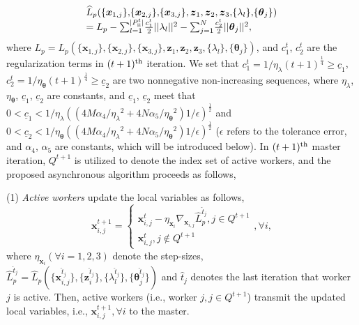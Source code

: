 \documentclass[letterpaper]{article} %
\begin{document}
\begin{equation}
\begin{array}{l}
\widehat{L}_p(\{{\boldsymbol{x}_{1,j}}\} ,\!\{{\boldsymbol{x}_{2,j}}\} ,\!\{{\boldsymbol{x}_{3,j}}\} ,{\boldsymbol{z}_1},{\boldsymbol{z}_2},{\boldsymbol{z}_3},\! \{\lambda_l\}, \!\{\boldsymbol{\theta}_j\} ) \\ = {L_p} - \sum\nolimits_{l = 1}^{|P_{{\rm{\uppercase\expandafter{\romannumeral2}}}}^{t}|} \!\frac{c_1^t}{2}||\lambda_l||^2 - \sum\nolimits_{j = 1}^{N}\! \frac{c_2^t}{2}||\boldsymbol{\theta}_j||^2,
\end{array}
\end{equation}
where $L_p\!=\!L_p(\{{\boldsymbol{x}_{1,j}}\} ,\!\{{\boldsymbol{x}_{2,j}}\} ,\!\{{\boldsymbol{x}_{3,j}}\} ,\!{\boldsymbol{z}_1},\!{\boldsymbol{z}_2},\!{\boldsymbol{z}_3},\! \{\lambda_l\}, \!\{\boldsymbol{\theta}_j\} )$, and $c_1^t$, $c_2^t$ are the regularization terms in $(t+1)^{\rm{th}}$ iteration. We set that ${c_1^t} =1/{{{\eta _{{\lambda}}}}{(t+1)^{\frac{1}{4}}}} \ge  \underline{c}_1$, ${c_2^t} = 1/{{{\eta _{{\boldsymbol{\theta }}}}}{(t+1)^{\frac{1}{4}}}}  \ge  \underline{c}_2$ are two nonnegative non-increasing sequences, where $\eta _{{\lambda}}$, $\eta _{{\boldsymbol{\theta }}}$, $\underline{c}_1$, $\underline{c}_2$ are constants, and $\underline{c}_1$, $\underline{c}_2$ meet that $0\!<\!\underline{c}_1\!<\!1/\eta _{{\lambda}}({({{4M\alpha_4}} / {{{{\eta _{\lambda}}}^2}} \!+\! {{4N\alpha_5}}/{{{{\eta _{\boldsymbol{\theta }}}}^2}})}1/\epsilon)^{\frac{1}{2}}$ and $0\!<\!\underline{c}_2\!<\!1/\eta _{{\boldsymbol{\theta }}} ({({{4M\alpha_4}} / {{{{\eta _{\lambda}}}^2}} \!+\! {{4N\alpha_5}}/{{{{\eta _{\boldsymbol{\theta }}}}^2}})}1/\epsilon)^{\frac{1}{2}}$ ($\epsilon$ refers to the tolerance error, and $\alpha_4$, $\alpha_5$ are constants, which will be introduced below). In $(t+1)^{\rm{th}}$ master iteration, $Q^{t+1} $ is utilized to denote the index set of active workers, and the proposed asynchronous algorithm proceeds as follows,


\noindent (1) \emph{Active} \emph{workers} update the local variables as follows,
\begin{equation}
\label{eq:update_x1_asyn}
{\boldsymbol{x}_{i,j}^{t+1}} = \left\{ \begin{array}{l}
{\boldsymbol{x}_{i,j}^{t}} - \eta_{\boldsymbol{x}_i} \nabla_{\!\boldsymbol{x}_{i,j}} \widehat{L}_p^{\hat{t}_j}, j\in Q^{t+1}\\
{\boldsymbol{x}_{i,j}^{t}}, j\notin Q^{t+1}
\end{array} \right., \forall i,
\end{equation}
where $\eta_{\boldsymbol{x}_i} (\forall i=1,2,3)$ denote the step-sizes, $\widehat{L}_p^{\hat{t}_j} = \widehat{L}_p(\{{\boldsymbol{x}_{i,j}^{\hat{t}_j}}\} ,\!\{{\boldsymbol{z}_i^{\hat{t}_j}}\}, \!\{\lambda_l^{\hat{t}_j}\}, \!\{\boldsymbol{\theta}_j^{\hat{t}_j}\} )$ and ${\hat{t}_j}$ denotes the last iteration that worker $j$ is active. Then, active workers (i.e., worker $j, j\in Q^{t+1}$) transmit the updated local variables, i.e., $\boldsymbol{x}_{i,j}^{t+1}, \forall i$ to the master.
\end{document}

